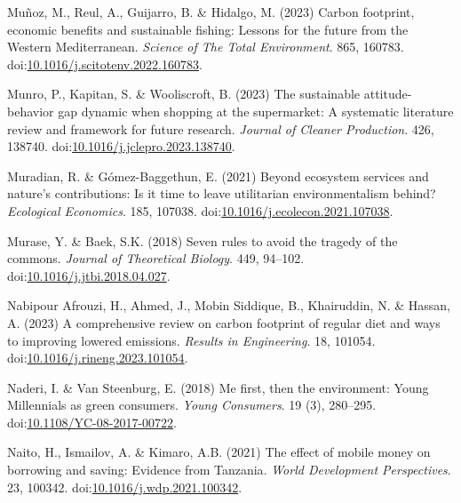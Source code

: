 \documentclass[
  letterpaper,
  DIV=11,
  numbers=noendperiod]{scrartcl}
\newlength{\cslhangindent}
\newenvironment{CSLReferences}[2] %
 {\begin{list}{}{%
  \setlength{\itemindent}{0pt}
  \setlength{\leftmargin}{0pt}
  \setlength{\parsep}{0pt}
  \ifodd #1
   \setlength{\leftmargin}{\cslhangindent}
   \setlength{\itemindent}{-1\cslhangindent}
  \fi
  \setlength{\itemsep}{#2\baselineskip}}}
 {\end{list}}
\begin{document}
\begin{CSLReferences}{0}{1}
Muñoz, M., Reul, A., Guijarro, B. \& Hidalgo, M. (2023) Carbon
footprint, economic benefits and sustainable fishing: {Lessons} for the
future from the {Western Mediterranean}. \emph{Science of The Total
Environment}. 865, 160783.
doi:\href{https://doi.org/10.1016/j.scitotenv.2022.160783}{10.1016/j.scitotenv.2022.160783}.

Munro, P., Kapitan, S. \& Wooliscroft, B. (2023) The sustainable
attitude-behavior gap dynamic when shopping at the supermarket: {A}
systematic literature review and framework for future research.
\emph{Journal of Cleaner Production}. 426, 138740.
doi:\href{https://doi.org/10.1016/j.jclepro.2023.138740}{10.1016/j.jclepro.2023.138740}.

Muradian, R. \& Gómez-Baggethun, E. (2021) Beyond ecosystem services and
nature's contributions: {Is} it time to leave utilitarian
environmentalism behind? \emph{Ecological Economics}. 185, 107038.
doi:\href{https://doi.org/10.1016/j.ecolecon.2021.107038}{10.1016/j.ecolecon.2021.107038}.

Murase, Y. \& Baek, S.K. (2018) Seven rules to avoid the tragedy of the
commons. \emph{Journal of Theoretical Biology}. 449, 94--102.
doi:\href{https://doi.org/10.1016/j.jtbi.2018.04.027}{10.1016/j.jtbi.2018.04.027}.

Nabipour Afrouzi, H., Ahmed, J., Mobin Siddique, B., Khairuddin, N. \&
Hassan, A. (2023) A comprehensive review on carbon footprint of regular
diet and ways to improving lowered emissions. \emph{Results in
Engineering}. 18, 101054.
doi:\href{https://doi.org/10.1016/j.rineng.2023.101054}{10.1016/j.rineng.2023.101054}.

Naderi, I. \& Van Steenburg, E. (2018) Me first, then the environment:
Young {Millennials} as green consumers. \emph{Young Consumers}. 19 (3),
280--295.
doi:\href{https://doi.org/10.1108/YC-08-2017-00722}{10.1108/YC-08-2017-00722}.

Naito, H., Ismailov, A. \& Kimaro, A.B. (2021) The effect of mobile
money on borrowing and saving: {Evidence} from {Tanzania}. \emph{World
Development Perspectives}. 23, 100342.
doi:\href{https://doi.org/10.1016/j.wdp.2021.100342}{10.1016/j.wdp.2021.100342}.


\end{CSLReferences}
\end{document}
